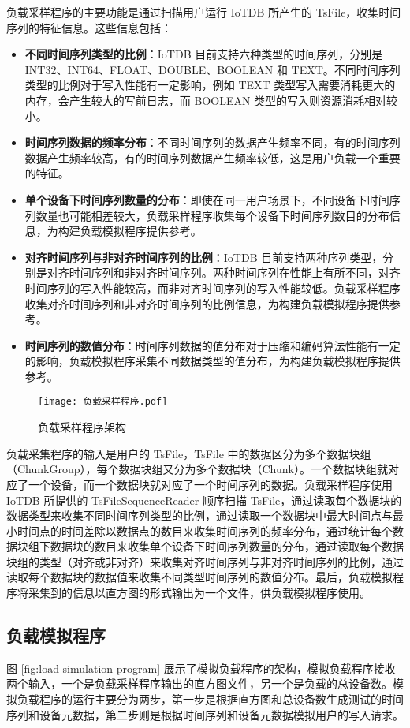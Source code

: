 负载采样程序的主要功能是通过扫描用户运行 IoTDB 所产生的 TsFile，收集时间序列的特征信息。这些信息包括：
\begin{itemize}
  \item \textbf{不同时间序列类型的比例}：IoTDB 目前支持六种类型的时间序列，分别是 INT32、INT64、FLOAT、DOUBLE、BOOLEAN 和 TEXT。不同时间序列类型的比例对于写入性能有一定影响，例如 TEXT 类型写入需要消耗更大的内存，会产生较大的写前日志，而 BOOLEAN 类型的写入则资源消耗相对较小。
  \item \textbf{时间序列数据的频率分布}：不同时间序列的数据产生频率不同，有的时间序列数据产生频率较高，有的时间序列数据产生频率较低，这是用户负载一个重要的特征。
  \item \textbf{单个设备下时间序列数量的分布}：即使在同一用户场景下，不同设备下时间序列数量也可能相差较大，负载采样程序收集每个设备下时间序列数目的分布信息，为构建负载模拟程序提供参考。
  \item \textbf{对齐时间序列与非对齐时间序列的比例}：IoTDB 目前支持两种序列类型，分别是对齐时间序列和非对齐时间序列。两种时间序列在性能上有所不同，对齐时间序列的写入性能较高，而非对齐时间序列的写入性能较低。负载采样程序收集对齐时间序列和非对齐时间序列的比例信息，为构建负载模拟程序提供参考。
  \item \textbf{时间序列的数值分布}：时间序列数据的值分布对于压缩和编码算法性能有一定的影响，负载模拟程序采集不同数据类型的值分布，为构建负载模拟程序提供参考。
\end{itemize}

\begin{figure}
  \centering
  \texttt{[image: 负载采样程序.pdf]}
  \caption{负载采样程序架构}
  \label{fig:load-sampling-program}
\end{figure}

负载采集程序的输入是用户的 TsFile，TsFile 中的数据区分为多个数据块组（ChunkGroup），每个数据块组又分为多个数据块（Chunk）。一个数据块组就对应了一个设备，而一个数据块就对应了一个时间序列的数据。负载采样程序使用 IoTDB 所提供的 TsFileSequenceReader 顺序扫描 TsFile，通过读取每个数据块的数据类型来收集不同时间序列类型的比例，通过读取一个数据块中最大时间点与最小时间点的时间差除以数据点的数目来收集时间序列的频率分布，通过统计每个数据块组下数据块的数目来收集单个设备下时间序列数量的分布，通过读取每个数据块组的类型（对齐或非对齐）来收集对齐时间序列与非对齐时间序列的比例，通过读取每个数据块的数据值来收集不同类型时间序列的数值分布。最后，负载模拟程序将采集到的信息以直方图的形式输出为一个文件，供负载模拟程序使用。

\subsection{负载模拟程序}
图 \ref{fig:load-simulation-program} 展示了模拟负载程序的架构，模拟负载程序接收两个输入，一个是负载采样程序输出的直方图文件，另一个是负载的总设备数。模拟负载程序的运行主要分为两步，第一步是根据直方图和总设备数生成测试的时间序列和设备元数据，第二步则是根据时间序列和设备元数据模拟用户的写入请求。

